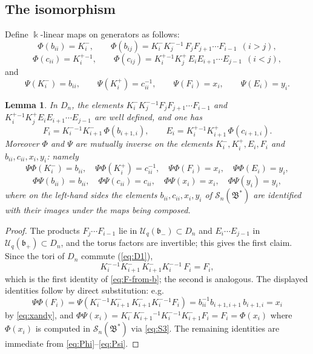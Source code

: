 \documentclass[11pt]{amsart}
\newcommand{\bk}{\Bbbk}
\newcommand{\U}{\mathscr U}
\newcommand{\fb}{\mathfrak b}
\newcommand{\KP}{K^{+}}
\newcommand{\KM}{K^{-}}
\theoremstyle{plain}
\newtheorem{lemma}[theorem]{Lemma}
\theoremstyle{definition}
\numberwithin{equation}{section}
\begin{document}
\subsection{The isomorphism}

Define $\bk$-linear maps on generators as follows:
\begin{equation}\label{eq:Phi}
\Phi(b_{ii})=\KM_i,\qquad
\Phi(b_{ij})=\KM_i\KM_j^{-1}\,F_jF_{j+1}\cdots F_{i-1}\ \ (i>j),
\end{equation}
\begin{equation}\label{eq:Phi2}
\Phi(c_{ii})=\KP_i^{-1},\qquad
\Phi(c_{ij})=\KP_i^{-1}\KP_j\,E_iE_{i+1}\cdots E_{j-1}\ \ (i<j),
\end{equation}
and
\begin{equation}\label{eq:Psi}
\Psi(\KM_i)=b_{ii},\qquad \Psi(\KP_i)=c_{ii}^{-1},\qquad
\Psi(F_i)=x_i,\qquad \Psi(E_i)=y_i .
\end{equation}

\begin{lemma}\label{lem:x-y}
In $D_n$, the elements
$\KM_i\KM_j^{-1}F_jF_{j+1}\cdots F_{i-1}$ and
$\KP_i^{-1}\KP_jE_iE_{i+1}\cdots E_{j-1}$ are well defined, and one has
\begin{equation}\label{eq:F-from-b}
F_i=\KM_i^{-1}\KM_{i+1}\,\Phi(b_{i+1,i}),\qquad
E_i=\KP_i^{-1}\KP_{i+1}\,\Phi(c_{i+1,i}) .
\end{equation}
Moreover $\Phi$ and $\Psi$ are mutually inverse on the elements
$\KM_i,\KP_i,E_i,F_i$ and $b_{ii},c_{ii},x_i,y_i$: namely
\[
\Psi\Phi(\KM_i)=b_{ii},\quad \Psi\Phi(\KP_i)=c_{ii}^{-1},\quad
\Psi\Phi(F_i)=x_i,\quad \Psi\Phi(E_i)=y_i,
\]
\[
\Phi\Psi(b_{ii})=b_{ii},\quad \Phi\Psi(c_{ii})=c_{ii},\quad
\Phi\Psi(x_i)=x_i,\quad\Phi\Psi(y_i)=y_i ,
\]
where on the left-hand sides the elements
$b_{ii},c_{ii},x_i,y_i$ of $\mathscr S_n(\mathfrak B^*)$ are identified with
their images under the maps being composed.
\end{lemma}

\begin{proof}
The products $F_j\cdots F_{i-1}$ lie in $\U_q(\fb_-)\subset D_n$ and
$E_i\cdots E_{j-1}$ in $\U_q(\fb_+)\subset D_n$, and the torus factors are
invertible; this gives the first claim.  Since the tori of $D_n$ commute
(\eqref{eq:D1}),
\[
\KM_i^{-1}\KM_{i+1}\,\KM_{i+1}\KM_i^{-1}\,F_i=F_i,
\]
which is the first identity of \eqref{eq:F-from-b}; the second is analogous.
The displayed identities follow by direct substitution: e.g.
\[
\Psi\Phi(F_i)=\Psi(\KM_i^{-1}\KM_{i+1}\,\KM_{i+1}\KM_i^{-1}F_i)
=b_{ii}^{-1}b_{i+1,i+1}\,b_{i+1,i}=x_i
\]
by \eqref{eq:xandy}, and
$\Phi\Psi(x_i)=\KM_i\KM_{i+1}^{-1}\KM_i^{-1}\KM_{i+1}F_i=F_i=\Phi(x_i)$ where
$\Phi(x_i)$ is computed in $\mathscr S_n(\mathfrak B^*)$ via \eqref{eq:S3}.
The remaining identities are immediate from \eqref{eq:Phi}--\eqref{eq:Psi}.
\end{proof}
\end{document}
